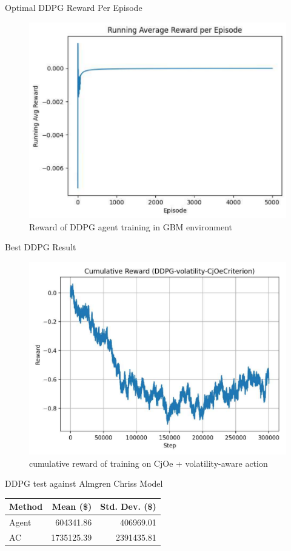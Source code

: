 \documentclass[11pt,aspectratio=169]{beamer}   %
\begin{document}
\begin{frame}{Optimal DDPG Reward Per Episode}
	\begin{figure}[ht]
		\centering
		\includegraphics[width=0.55\linewidth]{DDPG_Implementation_Reward_GBM.pdf}
		\caption{Reward of DDPG agent training in GBM environment }
	\end{figure}
\end{frame}

\begin{frame}{Best DDPG Result}
	\begin{figure}[ht]
		\centering
		\includegraphics[width=0.55\linewidth]{cumulative_reward.pdf}
		\caption{cumulative reward of training on CjOe + volatility-aware action}
	\end{figure}
\end{frame}

\begin{frame}{DDPG test against Almgren Chriss Model}
	\begin{table}[ht]
		\centering
		\begin{tabular}{lrr}
			\hline
			\textbf{Method} & \textbf{Mean (\$)}  & \textbf{Std. Dev. (\$)} \\ 
			\hline
			Agent           &  604341.86        &   406969.01             \\ 
			AC              & 1735125.39       & 2391435.81            \\ 
			\hline
		\end{tabular}
	\end{table}
\end{frame}
\end{document}
